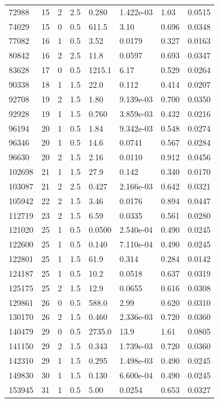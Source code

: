 \documentclass[preview]{standalone}
\begin{document}
{{\begin{tabular}{L{1.2cm}C{1.2cm} C{0.3cm}C{0.5cm} C{1.4cm}C{1.4cm} C{1.4cm}C{1.4cm}}
  72988  &    15  & 2     & 2.5 &  0.280  & 1.422e-03  & 1.03 &  0.0515   \\ 
  74029  &    15  & 0     & 0.5 &  611.5  & 3.10  & 0.696 &  0.0348   \\ 
  77082  &    16  & 1     & 0.5 &  3.52  & 0.0179  & 0.327 &  0.0163   \\ 
  80842  &    16  & 2     & 2.5 &  11.8  & 0.0597  & 0.693 &  0.0347   \\ 
  83628  &    17  & 0     & 0.5 &  1215.1  & 6.17  & 0.529 &  0.0264   \\ 
  90338  &    18  & 1     & 1.5 &  22.0  & 0.112  & 0.414 &  0.0207   \\ 
  92708  &    19  & 2     & 1.5 &  1.80  & 9.139e-03  & 0.700 &  0.0350   \\ 
  92928  &    19  & 1     & 1.5 &  0.760  & 3.859e-03  & 0.432 &  0.0216   \\ 
  96194  &    20  & 1     & 0.5 &  1.84  & 9.342e-03  & 0.548 &  0.0274   \\ 
  96346  &    20  & 1     & 0.5 &  14.6  & 0.0741  & 0.567 &  0.0284   \\ 
  96630  &    20  & 2     & 1.5 &  2.16  & 0.0110  & 0.912 &  0.0456   \\ 
  102698  &    21  & 1     & 1.5 &  27.9  & 0.142  & 0.340 &  0.0170   \\ 
  103087  &    21  & 2     & 2.5 &  0.427  & 2.166e-03  & 0.642 &  0.0321   \\ 
  105942  &    22  & 2     & 1.5 &  3.46  & 0.0176  & 0.894 &  0.0447   \\ 
  112719  &    23  & 2     & 1.5 &  6.59  & 0.0335  & 0.561 &  0.0280   \\ 
  121020  &    25  & 1     & 0.5 &  0.0500  & 2.540e-04  & 0.490 &  0.0245   \\ 
  122600  &    25  & 1     & 0.5 &  0.140  & 7.110e-04  & 0.490 &  0.0245   \\ 
  122801  &    25  & 1     & 1.5 &  61.9  & 0.314  & 0.284 &  0.0142   \\ 
  124187  &    25  & 1     & 0.5 &  10.2  & 0.0518  & 0.637 &  0.0319   \\ 
  125175  &    25  & 2     & 1.5 &  12.9  & 0.0655  & 0.616 &  0.0308   \\ 
  129861  &    26  & 0     & 0.5 &  588.0  & 2.99  & 0.620 &  0.0310   \\ 
  130170  &    26  & 2     & 1.5 &  0.460  & 2.336e-03  & 0.720 &  0.0360   \\ 
  140479  &    29  & 0     & 0.5 &  2735.0  & 13.9  & 1.61 &  0.0805   \\ 
  141150  &    29  & 2     & 1.5 &  0.343  & 1.739e-03  & 0.720 &  0.0360   \\ 
  142310  &    29  & 1     & 1.5 &  0.295  & 1.498e-03  & 0.490 &  0.0245   \\ 
  149830  &    30  & 1     & 1.5 &  0.130  & 6.600e-04  & 0.490 &  0.0245   \\ 
  153945  &    31  & 1     & 0.5 &  5.00  & 0.0254  & 0.653 &  0.0327   \\ 
\hline 
\end{tabular} 

}}
\end{document}
